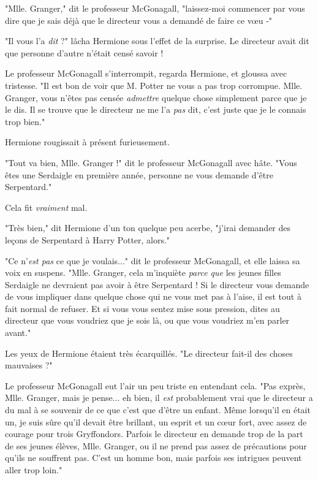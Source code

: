"Mlle. Granger," dit le professeur McGonagall, "laissez-moi commencer par vous dire que je sais déjà que le directeur vous a demandé de faire ce vœu -"

"Il vous l'a \emph{dit}  ?" lâcha Hermione sous l'effet de la surprise. Le directeur avait dit que personne d'autre n'était censé savoir !

Le professeur McGonagall s'interrompit, regarda Hermione, et gloussa avec tristesse. "Il est bon de voir que M. Potter ne vous a pas trop corrompue. Mlle. Granger, vous n'êtes pas censée \emph{admettre}  quelque chose simplement parce que je le dis. Il se trouve que le directeur ne me l'a \emph{pas}  dit, c'est juste que je le connais trop bien."

Hermione rougissait à présent furieusement.

"Tout va bien, Mlle. Granger !" dit le professeur McGonagall avec hâte. "Vous êtes une Serdaigle en première année, personne ne vous demande d'être Serpentard."

Cela fit \emph{vraiment}  mal.

"Très bien," dit Hermione d'un ton quelque peu acerbe, "j'irai demander des leçons de Serpentard à Harry Potter, alors."

"Ce n'\emph{est pas}  ce que je voulais..." dit le professeur McGonagall, et elle laissa sa voix en suspens. "Mlle. Granger, cela m'inquiète \emph{parce que}  les jeunes filles Serdaigle ne devraient pas avoir à être Serpentard ! Si le directeur vous demande de vous impliquer dans quelque chose qui ne vous met pas à l'aise, il est tout à fait normal de refuser. Et si vous vous sentez mise sous pression, dites au directeur que vous voudriez que je sois là, ou que vous voudriez m'en parler avant."

Les yeux de Hermione étaient très écarquillés. "Le directeur fait-il des choses mauvaises ?"

Le professeur McGonagall eut l'air un peu triste en entendant cela. "Pas exprès, Mlle. Granger, mais je pense... eh bien, il \emph{est}  probablement vrai que le directeur a du mal à se souvenir de ce que c'est que d'être un enfant. Même lorsqu'il en était un, je suis sûre qu'il devait être brillant, un esprit et un cœur fort, avec assez de courage pour trois Gryffondors. Parfois le directeur en demande trop de la part de ses jeunes élèves, Mlle. Granger, ou il ne prend pas assez de précautions pour qu'ils ne souffrent pas. C'est un homme bon, mais parfois ses intrigues peuvent aller trop loin."

